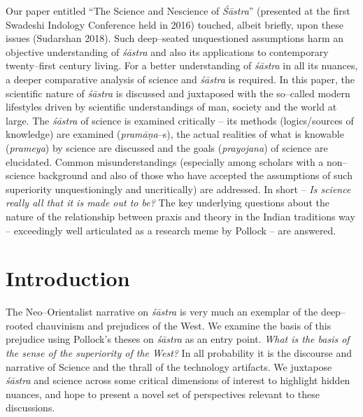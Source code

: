 Our paper entitled “The Science and Nescience of \textit{Śāstra}” (presented at the first Swadeshi Indology Conference held in 2016) touched, albeit briefly, upon these issues (Sudarshan 2018). Such deep–seated unquestioned assumptions harm an objective understanding of \textit{śāstra} and also its applications to contemporary twenty–first century living. For a better understanding of \textit{śāstra} in all its nuances, a deeper comparative analysis of science and \textit{śāstra} is required. In this paper, the scientific nature of \textit{śāstra} is discussed and juxtaposed with the so–called modern lifestyles driven by scientific understandings of man, society and the world at large. The \textit{śāstra} of science is examined critically – its methods (logics/sources of knowledge) are examined (\textit{pramāṇa}–s), the actual realities of what is knowable (\textit{prameya}) by science are discussed and the goals (\textit{prayojana}) of science are elucidated. Common misunderstandings (especially among scholars with a non–science background and also of those who have accepted the assumptions of such superiority unquestioningly and uncritically) are addressed. In short – \textit{Is science really all that it is made out to be?} The key underlying questions about the nature of the relationship between praxis and theory in the Indian traditions way – exceedingly well articulated as a research meme by Pollock  – are answered.


\section*{Introduction}

The Neo–Orientalist narrative on \textit{śāstra} is very much an exemplar of the deep–rooted chauvinism and prejudices of the West. We examine the basis of this prejudice using Pollock’s theses on \textit{śāstra} as an entry point. \textit{What is the basis of the sense of the superiority of the West?} In all probability it is the discourse and narrative of Science and the thrall of the technology artifacts. We juxtapose \textit{śāstra} and science across some critical dimensions of interest to highlight hidden nuances, and hope to present a novel set of perspectives relevant to these discussions.

